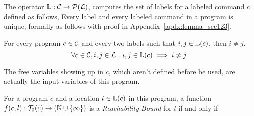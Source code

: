 The operator $\mathbb{L}: \mathcal{C} \to \mathcal{P}(\mathcal{L})$,
computes the set of labels
for a labeled command $c$ defined as follows,
%
Every label and every labeled command in a program is unique, formally as follows with proof in Appendix~\ref{apdx:lemma_sec123}.
\begin{lem}
  \label{lem:label_unique}
  For every program $c \in \mathcal{C}$ and every two labels such that
  $i, j \in \mathbb{L}(c)$, then $i \neq j$.
  \[
    \forall c \in \mathcal{C}, i, j \in \mathcal{L} ~.~ i, j \in \mathbb{L}(c)\implies i \neq j.
    \]
\end{lem}
%
The free variables
showing up in $c$, which aren't defined before be used, are actually the input variables of this program.
%
\begin{defn}
  \label{def:rb}
  For a program ${c}$ and a location $l \in \mathbb{L}(c)$ in this program,
a function $f(c, l) : \mathcal{T}_0(c) \to (\mathbb{N} \cup \{\infty\})$ is a \emph{Reachability-Bound} for $l$ if and only if
\end{defn}
